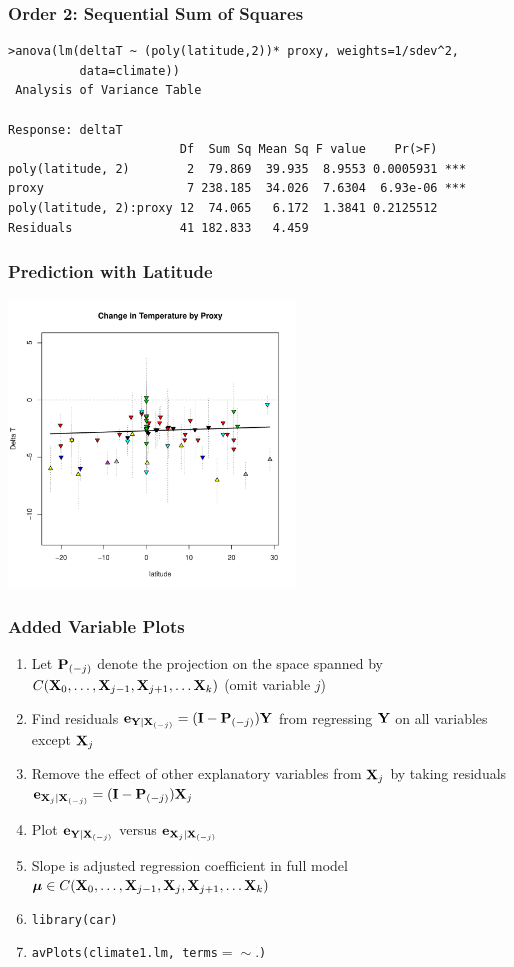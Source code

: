 \documentclass[handout]{beamer}
\begin{document}
\begin{frame}[fragile]
 \frametitle{Order 2: Sequential Sum of Squares}
   \begin{small}
\begin{verbatim}
>anova(lm(deltaT ~ (poly(latitude,2))* proxy, weights=1/sdev^2,
          data=climate))
 Analysis of Variance Table

Response: deltaT
                        Df  Sum Sq Mean Sq F value    Pr(>F)    
poly(latitude, 2)        2  79.869  39.935  8.9553 0.0005931 ***
proxy                    7 238.185  34.026  7.6304  6.93e-06 ***
poly(latitude, 2):proxy 12  74.065   6.172  1.3841 0.2125512    
Residuals               41 182.833   4.459                      
\end{verbatim}
\end{small}
\end{frame}
\begin{frame}
  \frametitle{Prediction with Latitude}
  \centerline{\includegraphics[height=3in]{pred-temp-lat}}
\end{frame}
\begin{frame}
  \frametitle{Added Variable Plots}
  \begin{enumerate}
  \item   Let $\P_{(-j)}$ denote the projection on the space spanned by
   $C(\X_0, \ldots, \X_{j-1}, \X_{j+1}, \ldots \X_k)$  (omit variable
    $j$) \pause
\item  Find residuals $\e_{\Y \mid \X_{(-j)}} = (\I - \P_{(-j)})\Y$
  from regressing $\Y$ on  all variables except $\X_j$ \pause
\item  Remove the effect of other explanatory variables from $\X_j$ by
  taking residuals $ \e_{\X_j \mid \X_{(-j)}} = (\I - \P_{(-j)})\X_j$ \pause
\item Plot $\e_{\Y \mid \X_{(-j)}}$ versus $\e_{\X_j \mid \X_{(-j)}}$ \pause
\item Slope is adjusted regression coefficient in full model $\mub \in
  C(\X_0, \ldots, \X_{j-1}, \X_j, \X_{j+1}, \ldots \X_k)$ \pause
\item {\tt library(car)} \pause
\item {\tt avPlots(climate1.lm, terms$=\sim .$)}
  \end{enumerate}
 \end{frame}
\end{document}

